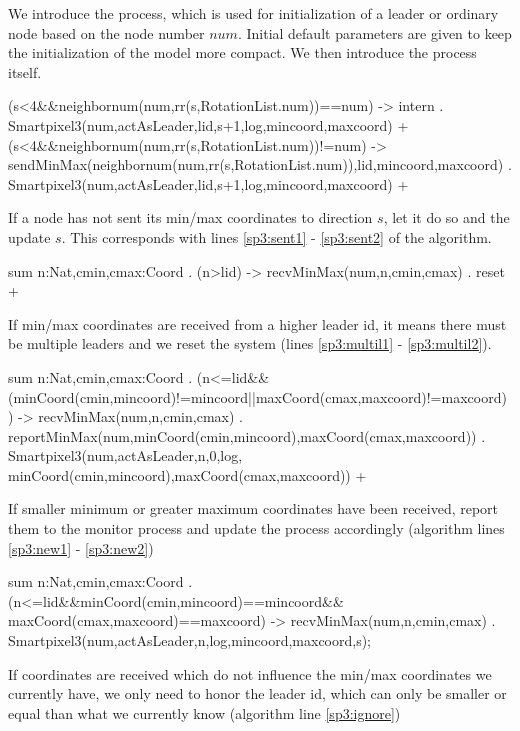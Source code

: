 We introduce the  process, which is used for initialization of a leader or ordinary node based on the node number $num$. Initial default parameters are given to keep the initialization of the model more compact. We then introduce the  process itself.

\begin{codeverb}
(s<4&&neighbornum(num,rr(s,RotationList.num))==num) -> intern .
    Smartpixel3(num,actAsLeader,lid,s+1,log,mincoord,maxcoord) +
(s<4&&neighbornum(num,rr(s,RotationList.num))!=num) ->
    sendMinMax(neighbornum(num,rr(s,RotationList.num)),lid,mincoord,maxcoord) .
    Smartpixel3(num,actAsLeader,lid,s+1,log,mincoord,maxcoord) +
\end{codeverb}

If a node has not sent its min/max coordinates to direction $s$, let it do so and the update $s$. This corresponds with lines \ref{sp3:sent1} - \ref{sp3:sent2} of the algorithm.

\begin{codeverb}
sum n:Nat,cmin,cmax:Coord . (n>lid) -> recvMinMax(num,n,cmin,cmax) . reset +
\end{codeverb}

If min/max coordinates are received from a higher leader id, it means there must be multiple leaders and we reset the system (lines \ref{sp3:multil1} - \ref{sp3:multil2}).

\begin{codeverb}
sum n:Nat,cmin,cmax:Coord . (n<=lid&&
    (minCoord(cmin,mincoord)!=mincoord||maxCoord(cmax,maxcoord)!=maxcoord)) ->
     recvMinMax(num,n,cmin,cmax) .
     reportMinMax(num,minCoord(cmin,mincoord),maxCoord(cmax,maxcoord)) .
     Smartpixel3(num,actAsLeader,n,0,log,
      minCoord(cmin,mincoord),maxCoord(cmax,maxcoord)) +
\end{codeverb}

If smaller minimum or greater maximum coordinates have been received, report them to the monitor process and update the process accordingly (algorithm lines \ref{sp3:new1} - \ref{sp3:new2})

\begin{codeverb}
sum n:Nat,cmin,cmax:Coord . (n<=lid&&minCoord(cmin,mincoord)==mincoord&&
    maxCoord(cmax,maxcoord)==maxcoord) ->
       recvMinMax(num,n,cmin,cmax) .
       Smartpixel3(num,actAsLeader,n,log,mincoord,maxcoord,s);
\end{codeverb}

If coordinates are received which do not influence the min/max coordinates we currently have, we only need to honor the leader id, which can only be smaller or equal than what we currently know (algorithm line \ref{sp3:ignore})

